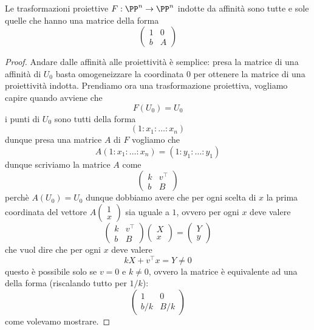 \documentclass[11pt]{scrartcl}
\begin{document}
   	 \begin{lemma}
   	 	Le trasformazioni proiettive $F:\PP^n\to\PP^n$ indotte da affinità sono tutte e sole quelle che hanno una matrice della forma
   	 	$$
   	 	\left(
   	 	\begin{array}{c|c}
   	 		1 & 0 \\
   	 		\hline 
   	 		b & A
   	 	\end{array}
   	 	\right)
   	 	$$
   	 \end{lemma}
   	 \begin{proof}
   	 	Andare dalle affinità alle proiettività è semplice: presa la matrice di una affinità di $U_0$ basta omogeneizzare la coordinata $0$ per ottenere la matrice di una proiettività indotta. Prendiamo ora una trasformazione proiettiva, vogliamo capire quando avviene che 
   	 	$$F(U_0)=U_0$$
   	 	i punti di $U_0$ sono tutti della forma
   	 	$$(1:x_1:\dots:x_n)$$
   	 	dunque presa una matrice $A$ di $F$ vogliamo che
   	 	$$A(1:x_1:\dots:x_n)=(1:y_1:\dots:y_1)$$
   	 	dunque scriviamo la matrice $A$ come
   	 	$$
   	 	\left(
   	 	\begin{array}{c|c}
   	 		k & v^\intercal \\
   	 		\hline
   	 		b & B
   	 	\end{array}
   	 	\right)
   	 	$$
   	 	perchè $A(U_0)=U_0$ dunque dobbiamo avere che per ogni scelta di $x$ la prima coordinata del vettore $A\begin{pmatrix}
   	 		1 \\
   	 		\hline
   	 		x
   	 	\end{pmatrix}$ sia uguale a $1$, ovvero per ogni $x$ deve valere
   	 	$$
   	 	\left(
   	 	\begin{array}{c|c}
   	 		k & v^\intercal \\
   	 		\hline
   	 		b & B
   	 	\end{array}
   	 	\right)
   	 	\left(
   	 	\begin{array}{c}
   	 		X \\
   	 		\hline
   	 		x
   	 	\end{array}
   	 	\right)=
   	 	\left(
   	 	\begin{array}{c}
   	 		Y \\
   	 		\hline
   	 		y
   	 	\end{array}
   	 	\right)
   	 	$$
   	 	che vuol dire che per ogni $x$ deve valere
   	 	$$kX+v^\intercal x =Y\ne 0$$
   	 	questo è possibile solo se $v=0$ e $k\ne 0$, ovvero la matrice è equivalente ad una della forma (riscalando tutto per $1/k$):
   	 	$$
   	 	\left(
   	 	\begin{array}{c|c}
   	 		1 & 0 \\
   	 		\hline
   	 		b/k & B/k
   	 	\end{array}
   	 	\right)
   	 	$$
   	 	come volevamo mostrare.
   	 \end{proof}
   	 
\end{document}
